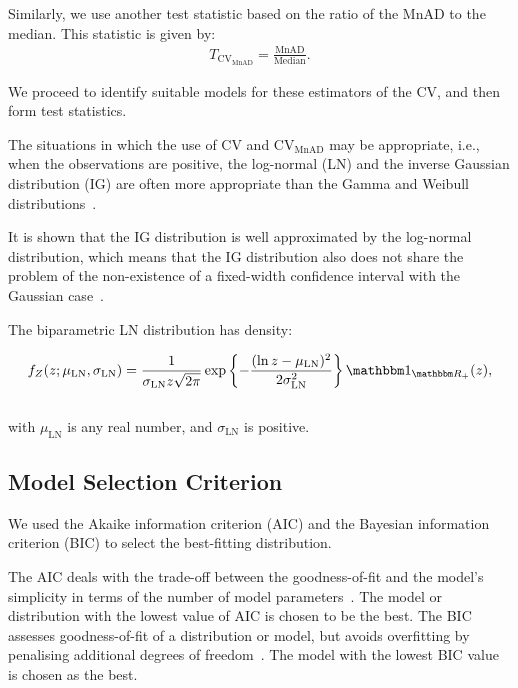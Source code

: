 Similarly, we use another test statistic based on the ratio of the MnAD
to the median. This statistic is given by: \begin{align}
    T_{\text{CV}_{\text{MnAD}}}=\frac{\text{MnAD}}{\text{Median}}.
\end{align}

We proceed to identify suitable models for these estimators of the CV,
and then form test statistics.

The situations in which the use of CV and \(\text{CV}_{\text{MnAD}}\)
may be appropriate, i.e., when the observations are positive, the
log-normal (LN) and the inverse Gaussian distribution (IG) are often
more appropriate than the Gamma and Weibull
distributions~\citep{Chaubey2017,takagi1997application}.

It is shown that the IG distribution is well approximated by the
log-normal distribution, which means that the IG distribution also does
not share the problem of the non-existence of a fixed-width confidence
interval with the Gaussian case~\citep{whitmore1978}.

The biparametric LN distribution has density:

\begin{align}
    f_Z(z;\mu_{\text{LN}}, \sigma_{\text{LN}} )=\frac{1}{\sigma_{\text{LN}} z\sqrt{2\pi}}\exp\left\{-\frac{(\ln z- \mu_{\text{LN}})^2}{2\sigma_{\text{LN}}^2}\right\}\mathbbm 1_{\mathbbm R_+}(z),
\end{align}\\
with \(\mu_{\text{LN}}\) is any real number, and \(\sigma_{\text{LN}}\)
is positive.

\subsection{Model Selection Criterion}\label{model-selection-criterion}

We used the Akaike information criterion (AIC) and the Bayesian
information criterion (BIC) to select the best-fitting distribution.

The AIC deals with the trade-off between the goodness-of-fit and the
model's simplicity in terms of the number of model
parameters~\citep{Burnham2004}. The model or distribution with the lowest
value of AIC is chosen to be the best. The BIC assesses goodness-of-fit
of a distribution or model, but avoids overfitting by penalising
additional degrees of freedom~\citep{Dziak2019}. The model with the
lowest BIC value is chosen as the best.

